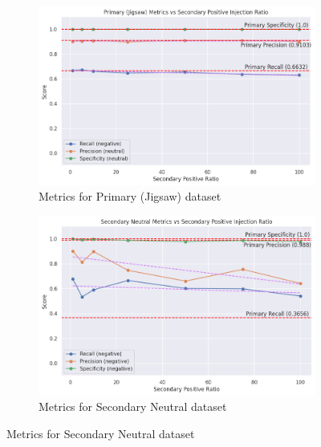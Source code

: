 \begin{figure}[ht]
    \centering
    \begin{subfigure}[b]{0.49\textwidth}
        \includegraphics[width=\textwidth]{graphs/ratio/combined_sl/primary.png}
        \caption{Metrics for Primary (Jigsaw) dataset}
        \label{subfig:primary_metrics_comb_sl}
    \end{subfigure}
    \hfill
    \begin{subfigure}[b]{0.49\textwidth}
        \includegraphics[width=\textwidth]{graphs/ratio/combined_sl/sn.png}
        \caption{Metrics for Secondary Neutral dataset}
        \label{subfig:secondary_neutral_metrics_comb_sl}
    \end{subfigure}

    \vspace{0.2cm}


\end{figure}
